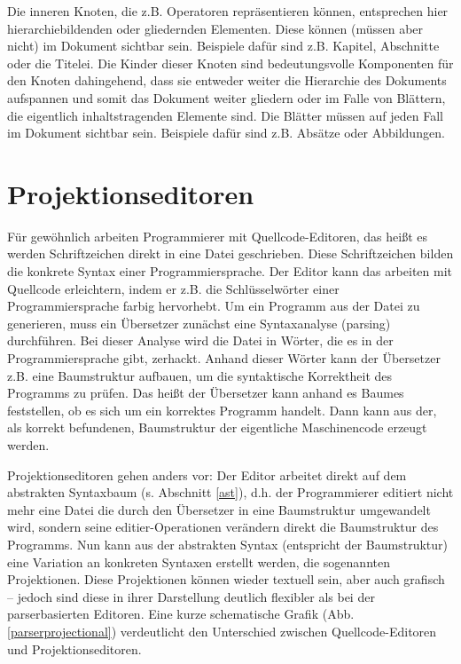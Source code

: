  
Die inneren Knoten, die z.B. Operatoren repräsentieren können, entsprechen hier hierarchiebildenden oder gliedernden Elementen. Diese können (müssen aber nicht) im Dokument sichtbar sein. Beispiele dafür sind z.B. Kapitel, Abschnitte oder die Titelei. Die Kinder dieser Knoten sind bedeutungsvolle Komponenten für den Knoten dahingehend, dass sie entweder weiter die Hierarchie des Dokuments aufspannen und somit das Dokument weiter gliedern oder im Falle von Blättern, die eigentlich inhaltstragenden Elemente sind. Die Blätter müssen auf jeden Fall im Dokument sichtbar sein. Beispiele dafür sind z.B. Absätze oder Abbildungen.

 
\section{Projektionseditoren}\label{}
 
Für gewöhnlich arbeiten Programmierer mit Quellcode-Editoren, das heißt es werden Schriftzeichen direkt in eine Datei geschrieben. Diese Schriftzeichen bilden die konkrete Syntax einer Programmiersprache. Der Editor kann das arbeiten mit Quellcode erleichtern, indem er z.B. die Schlüsselwörter einer Programmiersprache farbig hervorhebt. Um ein Programm aus der Datei zu generieren, muss ein Übersetzer zunächst eine Syntaxanalyse (parsing) durchführen. Bei dieser Analyse wird die Datei in Wörter, die es in der Programmiersprache gibt, zerhackt. Anhand dieser Wörter kann der Übersetzer z.B. eine Baumstruktur aufbauen, um die syntaktische Korrektheit des Programms zu prüfen. Das heißt der Übersetzer kann anhand es Baumes feststellen, ob es sich um ein korrektes Programm handelt. Dann kann aus der, als korrekt befundenen, Baumstruktur der eigentliche Maschinencode erzeugt werden.

 
Projektionseditoren gehen anders vor: Der Editor arbeitet direkt auf dem abstrakten Syntaxbaum (s. Abschnitt \ref{ast}), d.h. der Programmierer editiert nicht mehr eine Datei die durch den Übersetzer in eine Baumstruktur umgewandelt wird, sondern seine editier-Operationen verändern direkt die Baumstruktur des Programms. \citep[S.~68]{Voelter} Nun kann aus der abstrakten Syntax (entspricht der Baumstruktur) eine Variation an konkreten Syntaxen erstellt werden, die sogenannten Projektionen. Diese Projektionen können wieder textuell sein, aber auch grafisch -- jedoch sind diese in ihrer Darstellung deutlich flexibler als bei der parserbasierten Editoren. Eine kurze schematische Grafik (Abb. \ref{parserprojectional}) verdeutlicht den Unterschied zwischen Quellcode-Editoren und Projektionseditoren.

